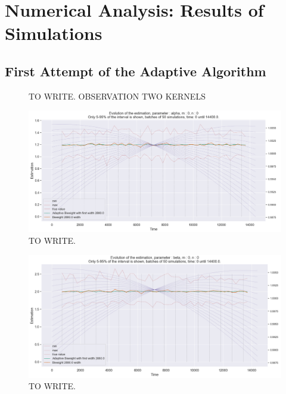 \chapter{Numerical Analysis: Results of Simulations}


\section{First Attempt of the Adaptive Algorithm}


\begin{figure}
\centering
{} 
\caption{TO WRITE. OBSERVATION TWO KERNELS}
\label{fig:TEST}
\end{figure}


\begin{figure}
\centering
\includegraphics[width = 0.90 \textwidth]{../imag/chap3/0/A.png}
\caption{TO WRITE.}
\label{fig:first_estimate_0_alpha}
\end{figure}

\begin{figure}
\centering
\includegraphics[width = 0.90 \textwidth]{../imag/chap3/0/B.png}
\caption{TO WRITE.}
\label{fig:first_estimate_0_beta}
\end{figure}

